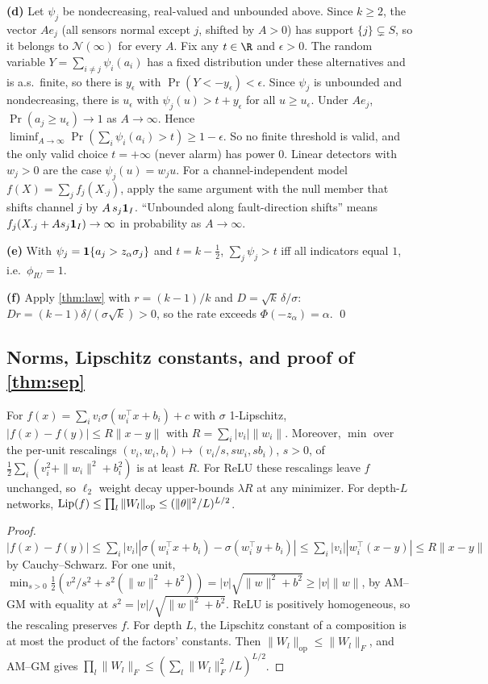 \textbf{(d)} Let $\psi_j$ be nondecreasing, real-valued and unbounded above. Since $k\ge2$, the vector $Ae_j$ (all sensors normal except $j$, shifted by $A>0$) has support $\{j\}\subsetneq S$, so it belongs to $\mathcal N(\infty)$ for every $A$. Fix any $t\in\R$ and $\epsilon>0$. The random variable $Y=\sum_{i\ne j}\psi_i(a_i)$ has a fixed distribution under these alternatives and is a.s.\ finite, so there is $y_\epsilon$ with $\Pr(Y<-y_\epsilon)<\epsilon$. Since $\psi_j$ is unbounded and nondecreasing, there is $u_\epsilon$ with $\psi_j(u)>t+y_\epsilon$ for all $u\ge u_\epsilon$. Under $Ae_j$, $\Pr(a_j\ge u_\epsilon)\to1$ as $A\to\infty$. Hence $\liminf_{A\to\infty}\Pr(\sum_i\psi_i(a_i)>t)\ge1-\epsilon$. So no finite threshold is valid, and the only valid choice $t=+\infty$ (never alarm) has power $0$. Linear detectors with $w_j>0$ are the case $\psi_j(u)=w_ju$. For a channel-independent model $f(X)=\sum_jf_j(X_{\cdot j})$, apply the same argument with the null member that shifts channel $j$ by $A\,s_j\mathbf{1}_I$. ``Unbounded along fault-direction shifts'' means $f_j(X_{\cdot j}+As_j\mathbf{1}_I)\to\infty$ in probability as $A\to\infty$.

\textbf{(e)} With $\psi_j=\mathbf{1}\{a_j>z_\alpha\sigma_j\}$ and $t=k-\frac12$, $\sum_j\psi_j>t$ iff all indicators equal $1$, i.e.\ $\phi_{IU}=1$.

\textbf{(f)} Apply \cref{thm:law} with $r=(k-1)/k$ and $D=\sqrt k\,\delta/\sigma$: $Dr=(k-1)\delta/(\sigma\sqrt k)>0$, so the rate exceeds $\Phi(-z_\alpha)=\alpha$. \qed

\subsection{Norms, Lipschitz constants, and proof of \texorpdfstring{\cref{thm:sep}}{Theorem 5}}
\begin{lemma}\label{lem:lip}
For $f(x)=\sum_iv_i\sigma(w_i^\top x+b_i)+c$ with $\sigma$ 1-Lipschitz, $|f(x)-f(y)|\le R\|x-y\|$ with $R=\sum_i|v_i|\|w_i\|$. Moreover, $\min$ over the per-unit rescalings $(v_i,w_i,b_i)\mapsto(v_i/s,sw_i,sb_i)$, $s>0$, of $\frac12\sum_i(v_i^2+\|w_i\|^2+b_i^2)$ is at least $R$. For ReLU these rescalings leave $f$ unchanged, so $\ell_2$ weight decay upper-bounds $\lambda R$ at any minimizer. For depth-$L$ networks, $\mathrm{Lip}(f)\le\prod_l\|W_l\|_{\mathrm{op}}\le(\|\theta\|^2/L)^{L/2}$.
\end{lemma}
\begin{proof}
$|f(x)-f(y)|\le\sum_i|v_i||\sigma(w_i^\top x+b_i)-\sigma(w_i^\top y+b_i)|\le\sum_i|v_i||w_i^\top(x-y)|\le R\|x-y\|$ by Cauchy--Schwarz. For one unit, $\min_{s>0}\frac12(v^2/s^2+s^2(\|w\|^2+b^2))=|v|\sqrt{\|w\|^2+b^2}\ge|v|\|w\|$, by AM--GM with equality at $s^2=|v|/\sqrt{\|w\|^2+b^2}$. ReLU is positively homogeneous, so the rescaling preserves $f$. For depth $L$, the Lipschitz constant of a composition is at most the product of the factors' constants. Then $\|W_l\|_{\mathrm{op}}\le\|W_l\|_F$, and AM--GM gives $\prod_l\|W_l\|_F\le(\sum_l\|W_l\|_F^2/L)^{L/2}$.
\end{proof}

